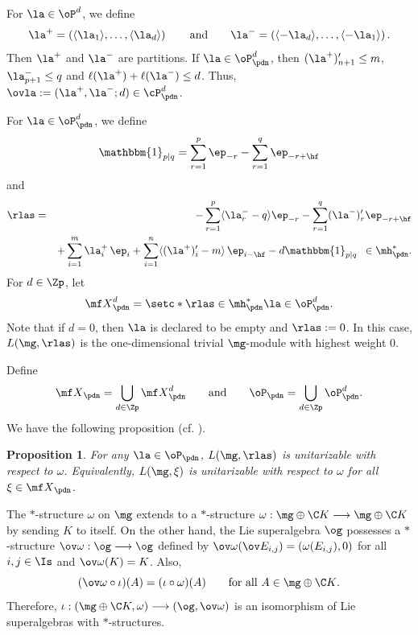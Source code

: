 \documentclass[11pt, reqno]{amsart}
\newtheorem{prop}[thm]{Proposition}
\theoremstyle{definition}
\theoremstyle{remark}
\numberwithin{equation}{section}
\begin{document}
For $\la \in \oP^d$, we define
\begin{equation} \label{part-pm}
\la^+=\left(\langle \la_1 \rangle,\ldots,\langle \la_d \rangle \right)
\qquad \text{and} \qquad
\la^-=\left(\langle -\la_d \rangle,\ldots,\langle -\la_1 \rangle \right).
\end{equation}
Then $\la^+$ and $\la^-$ are partitions.
%
If $\la \in \oP^d_\pdn$, then $(\la^+)'_{n+1}\leq m$, $\la^{-}_{p+1}\leq q$ and $\ell(\la^+)+\ell(\la^-)\le d$.
Thus, $\ovla:=(\la^+, \la^-; d) \in \cP_\pdn^d$.

For $\la \in \oP^d_\pdn$, we define
$$
\mathbbm{1}_{p|q}=\sum_{r=1}^{p} \ep_{-r}-\sum_{r=1}^{q} \ep_{-r+\hf}
$$
and
{\allowdisplaybreaks
\begin{eqnarray}\label{rlas}
 \rlas=& &-\sum_{r=1}^{p} \langle \la^{-}_{r}-q \rangle \ep_{-r}- \sum_{r=1}^{q} (\la^{-})^\prime_{r} \ep_{-r+\hf} \nonumber  \\
& &  +\sum_{i=1}^m \la^+_i \, \ep_i+\sum_{i=1}^n\langle(\la^+)'_i-m\rangle \,\ep_{i-\hf }-d\mathbbm{1}_{p|q} \,\, \, \in \mh^*_\pdn.
\end{eqnarray}
}
For $d \in \Zp$, let \begin{equation}\label{un-weight}
{\mf X}^d_\pdn=\setc*{ \rlas \in \mh^*_\pdn}{ \la \in \oP^d_\pdn}.
\end{equation}
Note that if $d=0$, then $\la$ is declared to be empty and $\rlas:=0$.
In this case, $L(\mg, \rlas)$ is the one-dimensional trivial $\mg$-module with highest weight $0$.

Define
$$
 {\mf X}_\pdn=\bigcup_{d \in \Zp}{\mf X}^d_\pdn\qquad \text{and} \qquad \oP_\pdn=\bigcup_{d \in \Zp}\oP^d_\pdn.
$$
We have the following proposition (cf. \cite{CLZ}).

\begin{prop} \label{CLZ}
For any  $\la  \in \oP_\pdn$, $L(\mg, \rlas)$ is unitarizable with respect to $\omega$. Equivalently, $L(\mg, \xi)$ is unitarizable with respect to $\omega$ for all $\xi \in {\mf X}_\pdn$.
\end{prop}


The $*$-structure $\omega$ on $\mg$ extends to a $*$-structure $\omega: \mg\oplus \C K \longrightarrow \mg\oplus \C K$ by sending $K$ to itself.
On the other hand, the Lie superalgebra $\og$ possesses a $*$-structure $\ov\omega: \og \longrightarrow \og$ defined by $\ov\omega (\ov E_{i,j})= (\omega (E_{i,j}), 0)$ for all $i, j \in \Is$ and $\ov\omega(K)=K$.
Also,
\begin{equation}\label{om-io}
 (\ov\omega \circ \iota) (A)=(\iota \circ \omega) (A) \qquad \mbox{for all $A \in \mg\oplus \C K$}.
 \end{equation}
 Therefore, $\iota: (\mg\oplus \C K, \omega) \longrightarrow (\og, \ov\omega)$ is an isomorphism of Lie superalgebras with $*$-structures.
\end{document}

